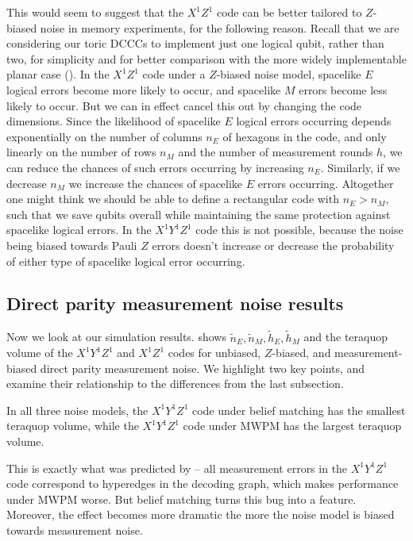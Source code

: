 This would seem to suggest that the $X^1 Z^1$ code can be better tailored to $Z$-biased noise in memory experiments,
for the following reason.
Recall that we are considering our toric DCCCs to implement just one logical qubit, rather than two, for simplicity and for better comparison with the more widely implementable planar case ().
In the $X^1 Z^1$ code under a $Z$-biased noise model, spacelike $E$ logical errors become more likely to occur,
and spacelike $M$ errors become less likely to occur.
But we can in effect cancel this out by changing the code dimensions.
Since the likelihood of spacelike $E$ logical errors occurring depends exponentially on the number of columns $n_E$ of hexagons in the code, and only linearly on the number of rows $n_M$ and the number of measurement rounds $h$, we can reduce the chances of such errors occurring by increasing $n_E$.
Similarly, if we decrease $n_M$ we increase the chances of spacelike $E$ errors occurring.
Altogether one might think we should be able to define a rectangular code with $n_E > n_M$,
such that we save qubits overall while maintaining the same protection against spacelike logical errors.
In the $X^1 Y^1 Z^1$ code this is not possible, because the noise being biased towards Pauli $Z$ errors doesn't increase or decrease the probability of either type of spacelike logical error occurring.

\subsection{Direct parity measurement noise results}\label{subsec:unrepetaed-direct-parity-measurement-noise}

Now we look at our simulation results.
 shows $\tilde{n}_E, \tilde{n}_M, \tilde{h}_E, \tilde{h}_M$ and the teraquop volume of the $X^1Y^1Z^1$ and $X^1Z^1$ codes for unbiased, $Z$-biased, and measurement-biased direct parity measurement noise.
We highlight two key points, and examine their relationship to the differences from the last subsection.

\begin{keypoint}\label{key:XYZ_XZ_best_and_worst}
    In all three noise models, the $X^1 Y^1 Z^1$ code under belief matching has the smallest teraquop volume,
    while the $X^1 Y^1 Z^1$ code under MWPM has the largest teraquop volume.
\end{keypoint}

This is exactly what was predicted by  -- all measurement errors in the $X^1 Y^1 Z^1$ code correspond to hyperedges in the decoding graph, which makes performance under MWPM worse.
But belief matching turns this bug into a feature.
Moreover, the effect becomes more dramatic the more the noise model is biased towards measurement noise.

